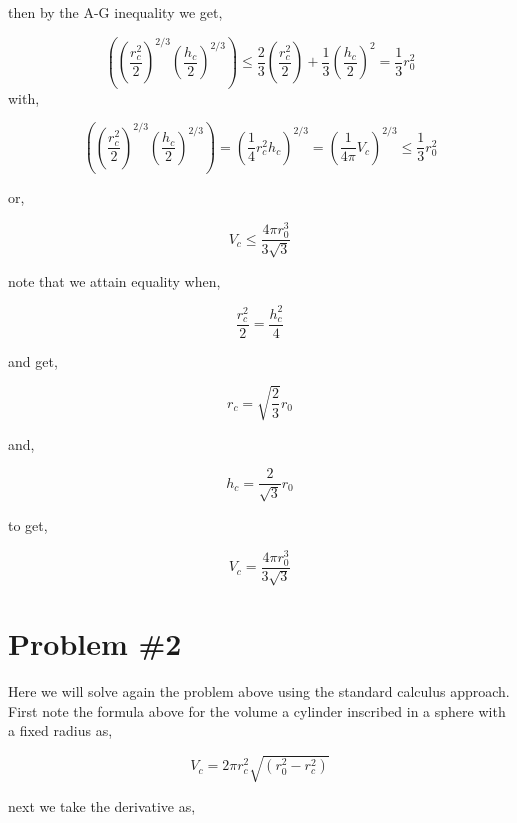 \documentclass{article}
\begin{document}
then by the A-G inequality we get,

\begin{equation*}
   \left(\left(\frac{r_c^2}{2}\right)^{2/3} \left(\frac{h_c}{2}\right)^{2/3}\right) \leq \frac{2}{3}\left(\frac{r_c^2}{2}\right) + \frac{1}{3}\left(\frac{h_c}{2}\right)^2 = \frac{1}{3}r_0^2 
\end{equation*}
with,

\begin{equation*}
    \left(\left(\frac{r_c^2}{2}\right)^{2/3} \left(\frac{h_c}{2}\right)^{2/3}\right) = \left( \frac{1}{4}r_c^2h_c\right)^{2/3} = \left( \frac{1}{4\pi}V_c\right)^{2/3} \leq \frac{1}{3}r_0^2
\end{equation*}

or,

\begin{equation*}
    V_c \leq \frac{4\pi r_0^3}{3\sqrt{3}}
\end{equation*}

note that we attain equality when,

\begin{equation*}
    \frac{r_c^2}{2} = \frac{h_c^2}{4}
\end{equation*}

and get,

\begin{equation*}
    r_c = \sqrt{\frac{2}{3}}r_0
\end{equation*}

and,

\begin{equation*}
    h_c = \frac{2}{\sqrt{3}}r_0
\end{equation*}

to get,

\begin{equation*}
    V_c = \frac{4\pi r_0^3}{3\sqrt{3}}
\end{equation*}
\section*{Problem \#2}
Here we will solve again the problem above using the standard calculus approach. First note the formula above for the volume a cylinder inscribed in a sphere with a fixed radius as,

\begin{equation*}
    V_c = 2\pi r_c^2\sqrt{(r_0^2 - r_c^2)}
\end{equation*}

next we take the derivative as,
\end{document}
